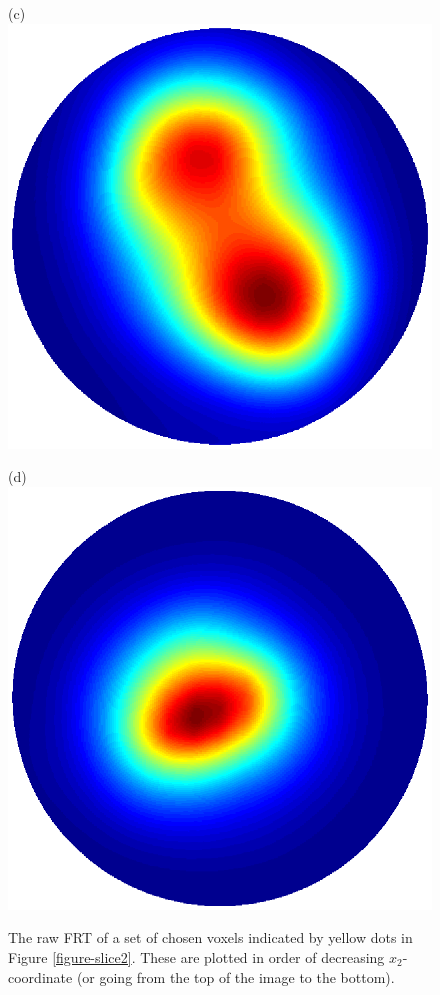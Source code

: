 \documentclass[dvips,aoas,preprint]{imsart}
\numberwithin{equation}{section}
\theoremstyle{plain}
\begin{document}
\begin{figure}[!htbp]
\begin{minipage}[]{0.20\textwidth}
    \end{minipage}
    \begin{minipage}[]{0.22\textwidth}
      \centering
      (c)
      \includegraphics*[width=\textwidth]{3659.ps}
    \end{minipage}
    \begin{minipage}[]{0.22\textwidth}
      \centering
      (d)
      \includegraphics*[width=\textwidth]{3763.ps}
    \end{minipage}
  \caption{The raw FRT of a set of chosen voxels indicated by yellow
    dots in Figure \ref{figure-slice2}. These are plotted in order of
    decreasing $x_2$-coordinate (or going from the top of the image to
    the bottom).}
  \label{fig:indvoxel}
\end{figure}
\end{document}
